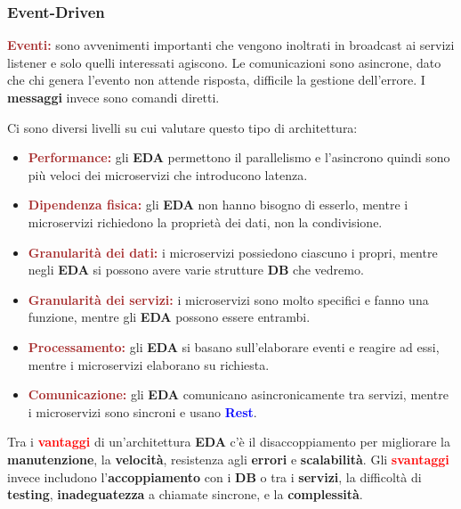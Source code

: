 \subsubsection{Event-Driven}
\begin{boxDef}
\textbf{\textcolor{brown}{Eventi:}} sono avvenimenti importanti che vengono inoltrati in broadcast ai servizi listener e solo quelli interessati agiscono. Le comunicazioni sono asincrone, dato che chi genera l'evento non attende risposta, difficile la gestione dell'errore. I \textbf{messaggi} invece sono comandi diretti.
\end{boxDef}
Ci sono diversi livelli su cui valutare questo tipo di architettura:
\begin{itemize}
    \item \textbf{\textcolor{brown}{Performance:}} gli \textbf{EDA} permettono il parallelismo e l'asincrono quindi sono più veloci dei microservizi che introducono latenza.
    \item \textbf{\textcolor{brown}{Dipendenza fisica:}} gli \textbf{EDA} non hanno bisogno di esserlo, mentre i microservizi richiedono la proprietà dei dati, non la condivisione.
    \item \textbf{\textcolor{brown}{Granularità dei dati:}} i microservizi possiedono ciascuno i propri, mentre negli \textbf{EDA} si possono avere varie strutture \textbf{DB} che vedremo.
    \item \textbf{\textcolor{brown}{Granularità dei servizi:}} i microservizi sono molto specifici e fanno una funzione, mentre gli \textbf{EDA} possono essere entrambi.
    \item \textbf{\textcolor{brown}{Processamento:}} gli \textbf{EDA} si basano sull'elaborare eventi e reagire ad essi, mentre i microservizi elaborano su richiesta.
    \item \textbf{\textcolor{brown}{Comunicazione:}} gli \textbf{EDA} comunicano asincronicamente tra servizi, mentre i microservizi sono sincroni e usano \textbf{\textcolor{blue}{Rest}}.
\end{itemize}

Tra i \textbf{\textcolor{red}{vantaggi}} di un'architettura \textbf{EDA} c'è il disaccoppiamento per migliorare la \textbf{manutenzione}, la \textbf{velocità}, resistenza agli \textbf{errori} e \textbf{scalabilità}. Gli \textbf{\textcolor{red}{svantaggi}} invece includono l'\textbf{accoppiamento} con i \textbf{DB} o tra i \textbf{servizi}, la difficoltà di \textbf{testing}, \textbf{inadeguatezza} a chiamate sincrone, e la \textbf{complessità}.

